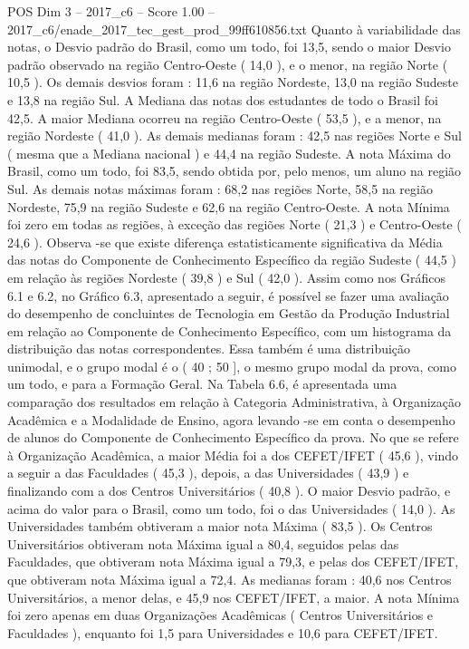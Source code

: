\begin{textsample}{POS Dim 3 – 2017\_c6 – Score 1.00 – 2017\_c6/enade\_2017\_tec\_gest\_prod\_99ff610856.txt}
Quanto à variabilidade das notas, o Desvio padrão do Brasil, como um todo, foi 13,5, sendo o maior Desvio padrão observado na região Centro-Oeste ( 14,0 ), e o menor, na região Norte ( 10,5 ).
Os demais desvios foram : 11,6 na região Nordeste, 13,0 na região Sudeste e 13,8 na região Sul.
A Mediana das notas dos estudantes de todo o Brasil foi 42,5.
A maior Mediana ocorreu na região Centro-Oeste ( 53,5 ), e a menor, na região Nordeste ( 41,0 ).
As demais medianas foram : 42,5 nas regiões Norte e Sul ( mesma que a Mediana nacional ) e 44,4 na região Sudeste.
A nota Máxima do Brasil, como um todo, foi 83,5, sendo obtida por, pelo menos, um aluno na região Sul.
As demais notas máximas foram : 68,2 nas regiões Norte, 58,5 na região Nordeste, 75,9 na região Sudeste e 62,6 na região Centro-Oeste.
A nota Mínima foi zero em todas as regiões, à exceção das regiões Norte ( 21,3 ) e Centro-Oeste ( 24,6 ).
Observa -se que existe diferença estatisticamente significativa da Média das notas do Componente de Conhecimento Específico da região Sudeste ( 44,5 ) em relação às regiões Nordeste ( 39,8 ) e Sul ( 42,0 ).
Assim como nos Gráficos 6.1 e 6.2, no Gráfico 6.3, apresentado a seguir, é possível se fazer uma avaliação do desempenho de concluintes de Tecnologia em Gestão da Produção Industrial em relação ao Componente de Conhecimento Específico, com um histograma da distribuição das notas correspondentes.
Essa também é uma distribuição unimodal, e o grupo modal é o ( 40 ; 50 ], o mesmo grupo modal da prova, como um todo, e para a Formação Geral.
Na Tabela 6.6, é apresentada uma comparação dos resultados em relação à Categoria Administrativa, à Organização Acadêmica e a Modalidade de Ensino, agora levando -se em conta o desempenho de alunos do Componente de Conhecimento Específico da prova.
No que se refere à Organização Acadêmica, a maior Média foi a dos CEFET/IFET ( 45,6 ), vindo a seguir a das Faculdades ( 45,3 ), depois, a das Universidades ( 43,9 ) e finalizando com a dos Centros Universitários ( 40,8 ).
O maior Desvio padrão, e acima do valor para o Brasil, como um todo, foi o das Universidades ( 14,0 ).
As Universidades também obtiveram a maior nota Máxima ( 83,5 ).
Os Centros Universitários obtiveram nota Máxima igual a 80,4, seguidos pelas das Faculdades, que obtiveram nota Máxima igual a 79,3, e pelas dos CEFET/IFET, que obtiveram nota Máxima igual a 72,4.
As medianas foram : 40,6 nos Centros Universitários, a menor delas, e 45,9 nos CEFET/IFET, a maior.
A nota Mínima foi zero apenas em duas Organizações Acadêmicas ( Centros Universitários e Faculdades ), enquanto foi 1,5 para Universidades e 10,6 para CEFET/IFET.

\end{textsample}
